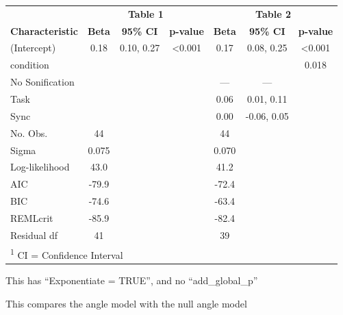\documentclass[10pt,a4paper,onecolumn]{article}
\begin{document}
\begin{table}
\centering\begingroup\fontsize{7}{9}\selectfont

\begin{tabular}{l|c|c|c|c|c|c}
\hline
\multicolumn{1}{c|}{ } & \multicolumn{3}{c|}{\textbf{Table 1}} & \multicolumn{3}{c}{\textbf{Table 2}} \\
\cline{2-4} \cline{5-7}
\textbf{Characteristic} & \textbf{Beta} & \textbf{95\% CI} & \textbf{p-value} & \textbf{Beta} & \textbf{95\% CI} & \textbf{p-value}\\
\hline
(Intercept) & 0.18 & 0.10, 0.27 & <0.001 & 0.17 & 0.08, 0.25 & <0.001\\
\hline
condition &  &  &  &  &  & 0.018\\
\hline
\hspace{1em}No Sonification &  &  &  & — & — & \\
\hline
\hspace{1em}Task &  &  &  & 0.06 & 0.01, 0.11 & \\
\hline
\hspace{1em}Sync &  &  &  & 0.00 & -0.06, 0.05 & \\
\hline
\hline
No. Obs. & 44 &  &  & 44 &  & \\
\hline
Sigma & 0.075 &  &  & 0.070 &  & \\
\hline
Log-likelihood & 43.0 &  &  & 41.2 &  & \\
\hline
AIC & -79.9 &  &  & -72.4 &  & \\
\hline
BIC & -74.6 &  &  & -63.4 &  & \\
\hline
REMLcrit & -85.9 &  &  & -82.4 &  & \\
\hline
Residual df & 41 &  &  & 39 &  & \\
\hline
\multicolumn{7}{l}{\rule{0pt}{1em}\textsuperscript{1} CI = Confidence Interval}\\
\end{tabular}
\endgroup{}
\end{table}

This has ``Exponentiate = TRUE'', and no ``add\_global\_p''

This compares the angle model with the null angle model
\end{document}
